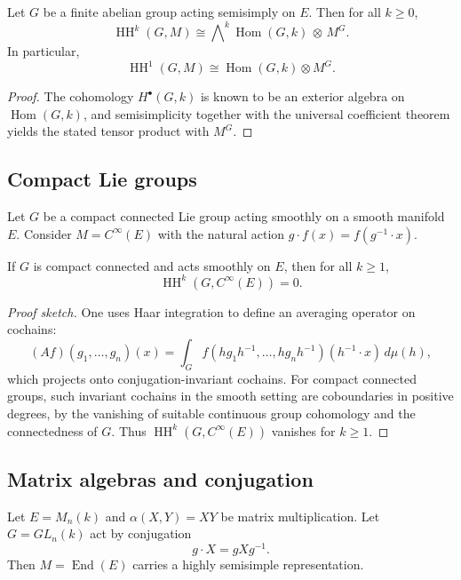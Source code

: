 \documentclass[11pt,a4paper]{article}
\numberwithin{equation}{section}
\DeclareMathOperator{\End}{End}
\DeclareMathOperator{\Hom}{Hom}
\DeclareMathOperator{\HH}{HH}
\begin{document}
	\begin{theorem}\label{thm:abelian}
		Let $G$ be a finite abelian group acting semisimply on $E$.
		Then for all $k\ge 0$,
		\[
		\HH^k(G,M) \cong \bigwedge\nolimits^k \Hom(G,k)\,\otimes\, M^G.
		\]
		In particular,
		\[
		\HH^1(G,M)\cong \Hom(G,k)\otimes M^G.
		\]
	\end{theorem}
	
	\begin{proof}
		The cohomology $H^\bullet(G,k)$ is known to be an exterior algebra on $\Hom(G,k)$,
		and semisimplicity together with the universal coefficient theorem yields the stated
		tensor product with $M^G$.
	\end{proof}
	
	\subsection{Compact Lie groups}
	
	Let $G$ be a compact connected Lie group acting smoothly on a smooth manifold $E$.
	Consider $M=C^\infty(E)$ with the natural action $g\cdot f(x)=f(g^{-1}\cdot x)$.
	
	\begin{theorem}\label{thm:compact-vanish}
		If $G$ is compact connected and acts smoothly on $E$, then for all $k\ge 1$,
		\[
		\HH^k(G,C^\infty(E)) = 0.
		\]
	\end{theorem}
	
	\begin{proof}[Proof sketch]
		One uses Haar integration to define an averaging operator on cochains:
		\[
		(Af)(g_1,\dots,g_n)(x)
		= \int_G f(hg_1h^{-1},\dots,hg_nh^{-1})(h^{-1}\cdot x)\,d\mu(h),
		\]
		which projects onto conjugation-invariant cochains.
		For compact connected groups, such invariant cochains in the smooth setting
		are coboundaries in positive degrees, by the vanishing of suitable continuous group cohomology
		and the connectedness of $G$.
		Thus $\HH^k(G,C^\infty(E))$ vanishes for $k\ge 1$.
	\end{proof}
	
	\subsection{Matrix algebras and conjugation}
	
	Let $E=M_n(k)$ and $\alpha(X,Y)=XY$ be matrix multiplication. Let $G=GL_n(k)$ act by conjugation
	\[
	g\cdot X = gXg^{-1}.
	\]
	Then $M=\End(E)$ carries a highly semisimple representation.
	
\end{document}

